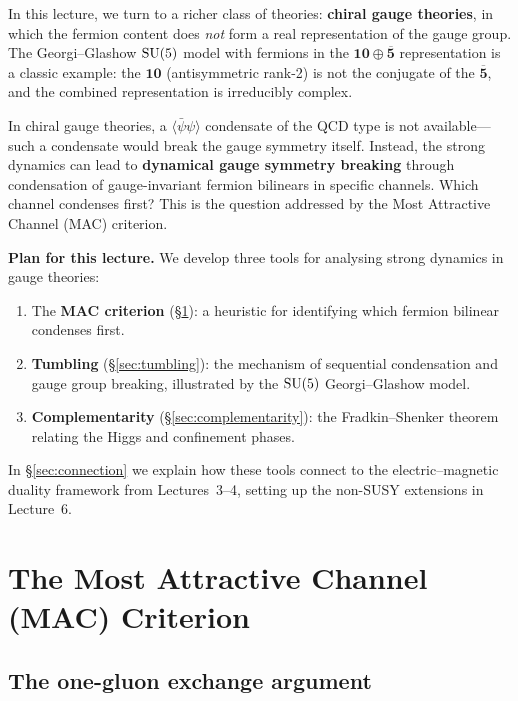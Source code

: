 \documentclass[11pt,a4paper]{article}
\begin{document}
In this lecture, we turn to a richer class of theories: \textbf{chiral
gauge theories}, in which the fermion content does \emph{not} form a
real representation of the gauge group.  The Georgi--Glashow $\mathrm{SU}(5)$
model with fermions in the $\mathbf{10} \oplus \overline{\mathbf{5}}$
representation is a classic example: the $\mathbf{10}$ (antisymmetric
rank-2) is not the conjugate of the $\overline{\mathbf{5}}$, and the
combined representation is irreducibly complex.

In chiral gauge theories, a $\langle \bar{\psi}\psi \rangle$ condensate
of the QCD type is not available---such a condensate would break the
gauge symmetry itself.  Instead, the strong dynamics can lead to
\textbf{dynamical gauge symmetry breaking} through condensation of
gauge-invariant fermion bilinears in specific channels.  Which channel
condenses first?  This is the question addressed by the Most Attractive
Channel (MAC) criterion.

\medskip

\textbf{Plan for this lecture.}  We develop three tools for analysing
strong dynamics in gauge theories:
\begin{enumerate}
  \item The \textbf{MAC criterion} (\S\ref{sec:MAC}): a heuristic for
    identifying which fermion bilinear condenses first.
  \item \textbf{Tumbling} (\S\ref{sec:tumbling}): the mechanism of
    sequential condensation and gauge group breaking, illustrated by
    the $\mathrm{SU}(5)$ Georgi--Glashow model.
  \item \textbf{Complementarity} (\S\ref{sec:complementarity}): the
    Fradkin--Shenker theorem relating the Higgs and confinement phases.
\end{enumerate}
In \S\ref{sec:connection} we explain how these tools connect to the
electric--magnetic duality framework from Lectures~3--4, setting up the
non-SUSY extensions in Lecture~6.


\section{The Most Attractive Channel (MAC) Criterion}
\label{sec:MAC}

\subsection{The one-gluon exchange argument}
\end{document}
